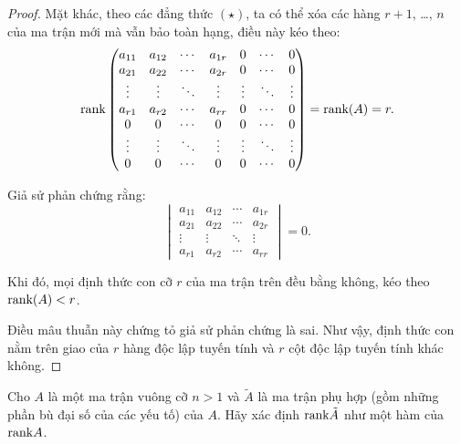 \begin{proof}
    Mặt khác, theo các đẳng thức $(\star)$, ta có thể xóa các hàng $r+1$, \ldots, $n$ của ma trận mới mà vẫn bảo toàn hạng, điều này kéo theo:
    \[
        \text{rank}
        \begin{pmatrix}
            a_{11} & a_{12} & \cdots & a_{1r} & 0      & \cdots & 0      \\
            a_{21} & a_{22} & \cdots & a_{2r} & 0      & \cdots & 0      \\
            \vdots & \vdots & \ddots & \vdots & \vdots & \ddots & \vdots \\
            a_{r1} & a_{r2} & \cdots & a_{rr} & 0      & \cdots & 0      \\
            0      & 0      & \cdots & 0      & 0      & \cdots & 0      \\
            \vdots & \vdots & \ddots & \vdots & \vdots & \ddots & \vdots \\
            0      & 0      & \cdots & 0      & 0      & \cdots & 0
        \end{pmatrix}
        = \text{rank}(A) = r.
    \]
    
    Giả sử phản chứng rằng:
    \[
        \begin{vmatrix}
            a_{11} & a_{12} & \cdots & a_{1r} \\
            a_{21} & a_{22} & \cdots & a_{2r} \\
            \vdots & \vdots & \ddots & \vdots \\
            a_{r1} & a_{r2} & \cdots & a_{rr}
        \end{vmatrix} = 0.
    \]
    
    Khi đó, mọi định thức con cỡ $r$ của ma trận trên đều bằng không, kéo theo $\text{rank}(A) < r$.
    
    Điều mâu thuẫn này chứng tỏ giả sử phản chứng là sai. Như vậy, định thức con nằm trên giao của $r$ hàng độc lập tuyến tính và $r$ cột độc lập tuyến tính khác không.
\end{proof}

\begin{exercise}
    Cho $A$ là một ma trận vuông cỡ $n > 1$ và $\tilde{A}$ là ma trận phụ hợp (gồm những phần bù đại số của các yếu tố) của $A$. Hãy xác định $\text{rank}\tilde{A}$ như một hàm của $\text{rank} A$.
\end{exercise}


